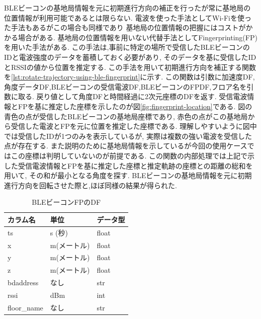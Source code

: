 BLEビーコンの基地局情報を元に初期進行方向の補正を行ったが常に基地局の位置情報が利用可能であるとは限らない.
電波を使った手法としてWi-Fiを使った手法もあるがこの場合も同様であり
基地局の位置情報の把握にはコストがかかる場合がある.
基地局の位置情報を用いない代替手法としてFingerprinting(FP)を用いた手法がある.
この手法は,事前に特定の場所で受信したBLEビーコンのIDと電波強度のデータを蓄積しておく必要があり,
そのデータを基に受信したIDとRSSIの値から位置を推定する.
この手法を用いて初期進行方向を補正する関数を\ref{lst:rotate-trajectory-using-ble-fingerprint}に示す.
この関数は引数に加速度DF,角度データDF,BLEビーコンの受信電波DF,BLEビーコンのFPDF,フロア名を引数に取る.
戻り値として角度DFと時間経過に2次元座標のDFを返す.
受信電波情報とFPを基に推定した座標を示したのが図\ref{fig:fingerprint-location}である.
図の青色の点が受信したBLEビーコンの基地局座標であり,
赤色の点がこの基地局から受信した電波とFPを元に位置を推定した座標である.
理解しやすいように図中では受信したIDが1つのみを表示しているが,
実際は複数の強い電波を受信した点が存在する.
また説明のために基地局情報を示しているが今回の使用ケースではこの座標は判明していないのが前提である.
この関数の内部処理では上記で示した受信電波情報とFPを基に推定した座標と推定軌跡の座標との距離の総和を用いて,
その和が最小となる角度を探す.
BLEビーコンの基地局情報を元に初期進行方向を回転させた際と,ほぼ同様の結果が得られた.


\begin{table}[ht]
	\centering
	\begin{tabular}{lll}
		\toprule
		カラム名        & 単位      & データ型  \\
		\midrule
		ts          & s (秒)   & float \\
		x           & m(メートル) & float \\
		y           & m(メートル) & float \\
		z           & m(メートル) & float \\
		bdaddress   & なし      & str   \\
		rssi        & dBm     & int   \\
		floor\_name & なし      & str   \\
		\bottomrule
	\end{tabular}
	\caption{BLEビーコンFPのDF}
	\label{table:ble-beacon-fingerprint-df}
\end{table}


